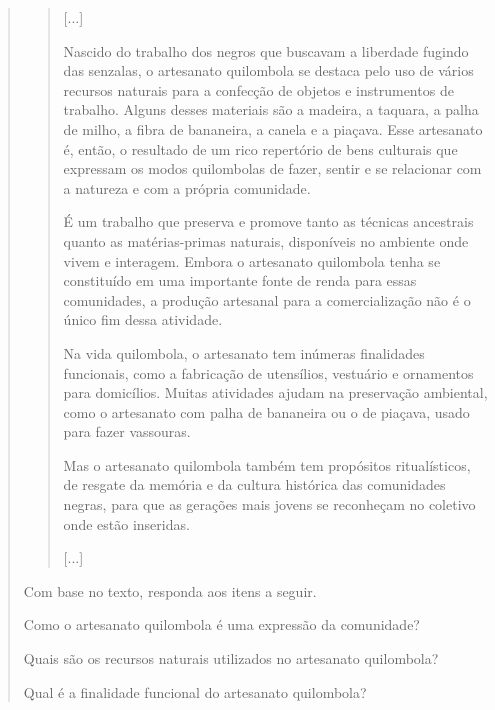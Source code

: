 \begin{escolha}
\begin{quote}
\begin{quote}
{[}...{]}

Nascido do trabalho dos negros que buscavam a liberdade fugindo das
senzalas, o artesanato quilombola se destaca pelo uso de vários recursos
naturais para a confecção de objetos e instrumentos de trabalho. Alguns
desses materiais são a madeira, a taquara, a palha de milho, a fibra de
bananeira, a canela e a piaçava. Esse artesanato é, então, o resultado
de um rico repertório de bens culturais que expressam os modos
quilombolas de fazer, sentir e se relacionar com a natureza e com a
própria comunidade.

É um trabalho que preserva e promove tanto as técnicas ancestrais quanto
as matérias-primas naturais, disponíveis no ambiente onde vivem e
interagem. Embora o artesanato quilombola tenha se constituído em uma
importante fonte de renda para essas comunidades, a produção artesanal
para a comercialização não é o único fim dessa atividade.

Na vida quilombola, o artesanato tem inúmeras finalidades funcionais,
como a fabricação de utensílios, vestuário e ornamentos para domicílios.
Muitas atividades ajudam na preservação ambiental, como o artesanato com
palha de bananeira ou o de piaçava, usado para fazer vassouras.

Mas o artesanato quilombola também tem propósitos ritualísticos, de
resgate da memória e da cultura histórica das comunidades negras, para
que as gerações mais jovens se reconheçam no coletivo onde estão
inseridas.

{[}...{]}

\end{quote}

Com base no texto, responda aos itens a seguir.

\begin{escolha}
\item Como o artesanato quilombola é uma expressão da comunidade?

\item Quais são os recursos naturais utilizados no artesanato quilombola?

\item Qual é a finalidade funcional do artesanato quilombola?


\end{escolha}
\end{quote}
\end{escolha}
